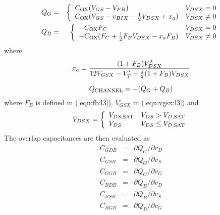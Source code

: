 \begin{eqnarray}
      Q_G &=& \left\{ \begin{array}{ll}
            C_{\ms{OX}} (V_{GS}-V_{FB}) &V_{DSX} = 0 \\
             C_{\ms{OX}} ( V_{GS} - v_{BIX} - \frac{1}{2} V_{DSX} + x_a )
            &V_{DSX} \ne 0
            \end{array} \right. %
            \\
       Q_B &=& \left\{ \begin{array}{ll}
            -C_{\ms{OX}} F_C &V_{DSX} = 0 \\
             -C_{\ms{OX}} ( F_C + \frac{1}{2} F_B V_{DSX}
             - x_a F_B ) &V_{DSX} \ne 0
            \end{array} \right. %
\end{eqnarray}
where
\begin{equation}
      x_a  = {{\textstyle (1+F_B) V_{DSX}^2}\over
              {12 V_{GSX} - V'_T - \frac{1}{2} (1+F_B) V_{DSX} }}
\end{equation}


\begin{equation}
Q_{\mbox{\scriptsize CHANNEL}} = -( Q_G + Q_B )
\end{equation}
where $F_B$ is defined in (\ref{eqn:fb:l3}),
$V_{GSX}$ in (\ref{eqn:vgsx:l3}) and
\begin{equation}
      V_{DSX}   = \left\{ \begin{array}{ll}
                    V_{DS,\ms{SAT}} & V_{DS} > V_{D,\ms{SAT}}\\
                    V_{DS} & V_{DS} \le V_{D,\ms{SAT}}
                    \end{array} \right. %
\end{equation}
The overlap capacitances are then evaluated as
\begin{eqnarray}
    C_{GDB}  &=& \partial Q_G / \partial v_D\\ 
    C_{GSB}  &=& \partial Q_G / \partial v_S\\ 
    C_{GGB}  &=& \partial Q_G / \partial v_G\\ 
    C_{BDB}  &=& \partial Q_B / \partial v_D\\ 
    C_{BSB}  &=& \partial Q_B / \partial v_S\\ 
    C_{BGB}  &=& \partial Q_B / \partial v_G
\end{eqnarray}

